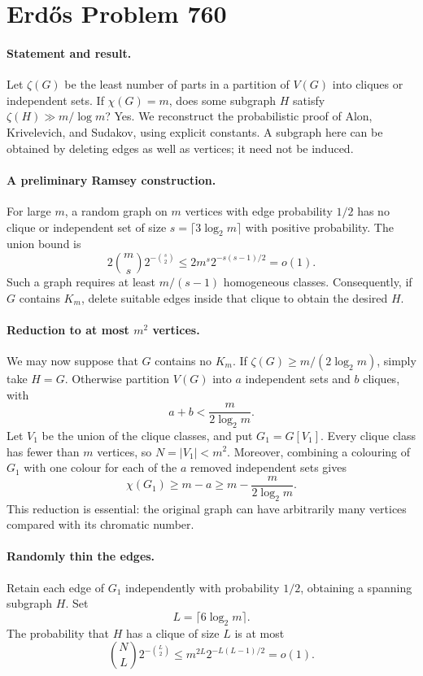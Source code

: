 \section*{Erd\H{o}s Problem 760}

\paragraph{Statement and result.}
Let \(\zeta(G)\) be the least number of parts in a partition of \(V(G)\) into cliques or independent sets. If \(\chi(G)=m\), does some subgraph \(H\) satisfy \(\zeta(H)\gg m/\log m\)? Yes. We reconstruct the probabilistic proof of Alon, Krivelevich, and Sudakov, using explicit constants. A subgraph here can be obtained by deleting edges as well as vertices; it need not be induced.

\paragraph{A preliminary Ramsey construction.}
For large \(m\), a random graph on \(m\) vertices with edge probability \(1/2\) has no clique or independent set of size \(s=\lceil3\log_2 m\rceil\) with positive probability. The union bound is
\[
 2\binom ms2^{-\binom s2}
 \leq2m^s2^{-s(s-1)/2}=o(1).
\]
Such a graph requires at least \(m/(s-1)\) homogeneous classes. Consequently, if \(G\) contains \(K_m\), delete suitable edges inside that clique to obtain the desired \(H\).

\paragraph{Reduction to at most \(m^2\) vertices.}
We may now suppose that \(G\) contains no \(K_m\). If \(\zeta(G)\geq m/(2\log_2 m)\), simply take \(H=G\). Otherwise partition \(V(G)\) into \(a\) independent sets and \(b\) cliques, with
\[
 a+b<\frac{m}{2\log_2m}.
\]
Let \(V_1\) be the union of the clique classes, and put \(G_1=G[V_1]\). Every clique class has fewer than \(m\) vertices, so \(N=|V_1|<m^2\). Moreover, combining a colouring of \(G_1\) with one colour for each of the \(a\) removed independent sets gives
\[
 \chi(G_1)\geq m-a\geq m-\frac{m}{2\log_2m}. \tag{1}
\]
This reduction is essential: the original graph can have arbitrarily many vertices compared with its chromatic number.

\paragraph{Randomly thin the edges.}
Retain each edge of \(G_1\) independently with probability \(1/2\), obtaining a spanning subgraph \(H\). Set
\[
 L=\lceil6\log_2m\rceil.
\]
The probability that \(H\) has a clique of size \(L\) is at most
\[
 \binom NL2^{-\binom L2}
 \leq m^{2L}2^{-L(L-1)/2}=o(1). \tag{2}
\]

